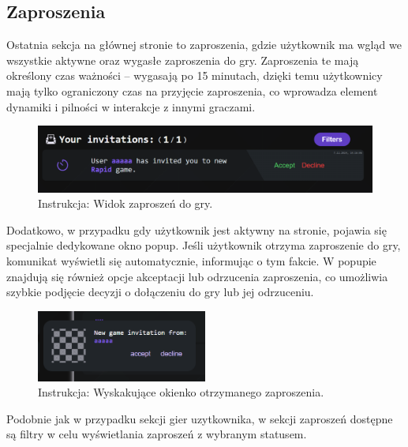 \documentclass[12pt,a4paper]{article}
\begin{document}
\newpage

\subsection{Zaproszenia}
Ostatnia sekcja na głównej stronie to zaproszenia, gdzie użytkownik ma wgląd we wszystkie aktywne oraz wygasłe zaproszenia do gry. Zaproszenia te mają określony czas ważności – wygasają po 15 minutach, dzięki temu użytkownicy mają tylko ograniczony czas na przyjęcie zaproszenia, co wprowadza element dynamiki i pilności w interakcje z innymi graczami.

\vspace{0.5cm}
\begin{figure}[h!]
    \centering
    \includegraphics[width=1\textwidth]{images/ins_min_inv_card.png}
    \caption{Instrukcja: Widok zaproszeń do gry.}
\end{figure}
\vspace{0.5cm}

\noindent
Dodatkowo, w przypadku gdy użytkownik jest aktywny na stronie, pojawia się specjalnie dedykowane okno popup. Jeśli użytkownik otrzyma zaproszenie do gry, komunikat wyświetli się automatycznie, informując o tym fakcie. W popupie znajdują się również opcje akceptacji lub odrzucenia zaproszenia, co umożliwia szybkie podjęcie decyzji o dołączeniu do gry lub jej odrzuceniu.

\vspace{0.5cm}
\begin{figure}[h!]
    \centering
    \includegraphics[width=0.5\textwidth]{images/ins_min_inv_popup.png}
    \caption{Instrukcja: Wyskakujące okienko otrzymanego zaproszenia.}
\end{figure}
\vspace{0.5cm}

\noindent
Podobnie jak w przypadku sekcji gier uzytkownika, w sekcji zaproszeń dostępne są filtry w celu wyświetlania zaproszeń z wybranym statusem.
\end{document}
